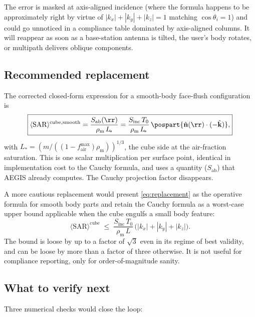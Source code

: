 \documentclass[11pt,a4paper]{article}
\theoremstyle{definition}
\theoremstyle{remark}
\newcommand{\Sab}{S_{\mathrm{ab}}}
\newcommand{\Sinc}{S_{\mathrm{inc}}}
\newcommand{\Tzero}{T_0}
\newcommand{\nhat}{\hat{\vb{n}}}
\newcommand{\khat}{\hat{\vb{k}}}
\newcommand{\SAR}{\ensuremath{\mathrm{SAR}}}
\newcommand{\rhom}{\rho_{\mathrm{m}}}
\newcommand{\Lact}{L_{\!*}}
\begin{document}
The error is masked at axis-aligned incidence (where the formula
happens to be approximately right by virtue of $|k_x|+|k_y|+|k_z|=1$
matching $\cos\theta_i=1$) and could go unnoticed in a compliance
table dominated by axis-aligned columns. It will reappear as soon as
a base-station antenna is tilted, the user's body rotates, or
multipath delivers oblique components.

\subsection{Recommended replacement}

The corrected closed-form expression for a smooth-body face-flush
configuration is
\begin{equation}\label{eq:replacement}
  \boxed{%
    \langle\SAR\rangle^{\mathrm{cube,smooth}}
    = \frac{\Sab(\rr)}{\rhom\,\Lact}
    = \frac{\Sinc\,\Tzero}{\rhom\,\Lact}\,
      \pospart{\nhat(\rr)\cdot(-\khat)},
  }
\end{equation}
with $\Lact = (m/((1-f_{\mathrm{air}}^{\max})\rhom))^{1/3}$, the
cube side at the air-fraction saturation. This is one scalar
multiplication per surface point, identical in implementation cost
to the Cauchy formula, and uses a quantity ($\Sab$) that AEGIS
already computes. The Cauchy projection
factor disappears.

A more cautious replacement would present
\cref{eq:replacement} as the operative formula for smooth body parts
and retain the Cauchy formula as a worst-case upper bound applicable
when the cube engulfs a small body feature:
\begin{equation}\label{eq:bound}
  \langle\SAR\rangle^{\mathrm{cube}}
  \;\leq\; \frac{\Sinc\,\Tzero}{\rhom\,L}\,
    \bigl(|k_x|+|k_y|+|k_z|\bigr).
\end{equation}
The bound is loose by up to a factor of $\sqrt{3}$ even in its regime
of best validity, and can be loose by more than a factor of three
otherwise. It is not useful for compliance reporting, only for
order-of-magnitude sanity.

\subsection{What to verify next}

Three numerical checks would close the loop:
\end{document}
